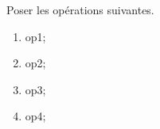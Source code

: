 \documentclass[exercice]{thedocument}%
\begin{document}
%
Poser les opérations suivantes.
\begin{enumerate}
    \item \<op1;
    \item \<op2;
    \item \<op3;
    \item \<op4;
\end{enumerate}
\end{document}
